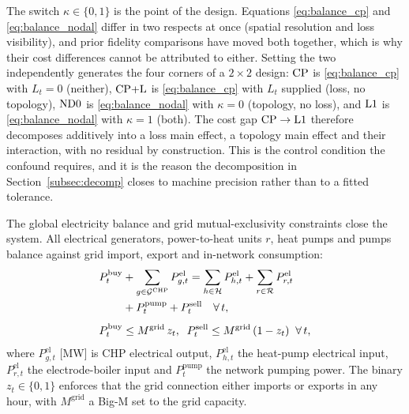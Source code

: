 The switch $\kappa \in \{0,1\}$ is the point of the design. Equations
\eqref{eq:balance_cp} and \eqref{eq:balance_nodal} differ in two respects at once
(spatial resolution and loss visibility), and prior fidelity comparisons have moved both
together, which is why their cost differences cannot be attributed to either. Setting the
two independently generates the four corners of a $2\times2$ design: $\mathrm{CP}$ is
\eqref{eq:balance_cp} with $L_t = 0$ (neither), $\mathrm{CP{+}L}$ is \eqref{eq:balance_cp} with
$L_t$ supplied (loss, no topology), $\mathrm{ND0}$ is \eqref{eq:balance_nodal} with $\kappa = 0$
(topology, no loss), and $\mathrm{L1}$ is \eqref{eq:balance_nodal} with $\kappa = 1$ (both).
The cost gap $\mathrm{CP} \to \mathrm{L1}$ therefore decomposes additively into a loss main effect, a
topology main effect and their interaction, with no residual by construction. This is the
control condition the confound requires, and it is the reason the decomposition in
Section~\ref{subsec:decomp} closes to machine precision rather than to a fitted
tolerance.

The global electricity balance and grid mutual-exclusivity constraints close the system.
All electrical generators, power-to-heat units $r$, heat pumps and pumps balance against
grid import, export and in-network consumption:
%
\begin{align}
  P_t^{\mathrm{buy}}
    &+ \sum_{g \in \mathcal{G}^{\mathrm{CHP}}} P_{g,t}^{\mathrm{el}}
  = \sum_{h \in \mathcal{H}} P_{h,t}^{\mathrm{el}}
    + \sum_{r \in \mathcal{R}} P_{r,t}^{\mathrm{el}} \notag \\
    &+ P_t^{\mathrm{pump}} + P_t^{\mathrm{sell}}
  \quad \forall\, t,
  \label{eq:balance_el} \\[4pt]
  P_t^{\mathrm{buy}} &\leq M^{\mathrm{grid}}\, z_t,
  \;\;
  P_t^{\mathrm{sell}} \leq M^{\mathrm{grid}}\, (1 - z_t)
  \;\; \forall\, t,
  \label{eq:grid_bigm}
\end{align}
%
where $P_{g,t}^{\mathrm{el}}$ [MW] is CHP electrical output, $P_{h,t}^{\mathrm{el}}$ the
heat-pump electrical input, $P_{r,t}^{\mathrm{el}}$ the electrode-boiler input and
$P_t^{\mathrm{pump}}$ the network pumping power. The binary $z_t \in \{0,1\}$ enforces
that the grid connection either imports or exports in any hour, with $M^{\mathrm{grid}}$
a Big-M set to the grid capacity.

